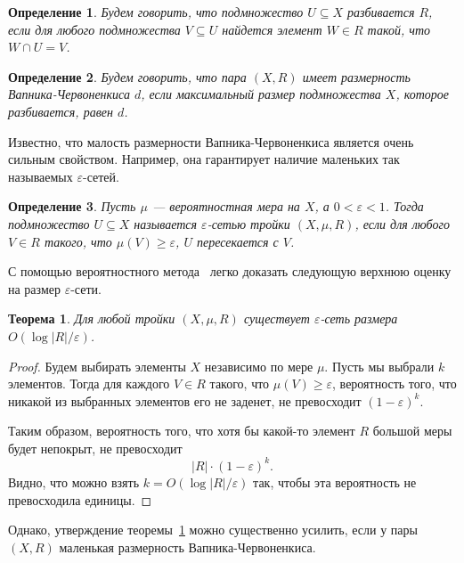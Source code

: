 \documentclass[12pt]{article}
\newtheorem{definition}{Определение}
\newtheorem{theorem}{Теорема}
\begin{document}
    \begin{definition}
        Будем говорить, что подмножество $U \subseteq X$ \emph{разбивается} $R$, если
        для любого подмножества $V \subseteq U$ найдется элемент $W \in R$ такой,
        что $W \cap U = V$.
    \end{definition}
    \begin{definition}
        Будем говорить, что пара $(X, R)$ имеет размерность Вапника-Червоненкиса $d$, если максимальный размер 
        подмножества $X$, которое разбивается, равен $d$.
    \end{definition}

    Известно, что малость размерности Вапника-Червоненкиса является очень сильным свойством. Например, она гарантирует
    наличие маленьких так называемых $\varepsilon$-сетей.

    \begin{definition}
        Пусть $\mu$ --- вероятностная мера на $X$, а $0 < \varepsilon < 1$.
        Тогда подмножество $U \subseteq X$
        называется \emph{$\varepsilon$-сетью} тройки $(X, \mu, R)$, если для любого
        $V \in R$ такого, что $\mu(V) \geq \varepsilon$, $U$ пересекается с $V$.
    \end{definition}

    С помощью вероятностного метода~\cite{AS92} легко доказать следующую верхнюю оценку на размер
    $\varepsilon$-сети.

    \begin{theorem}
        \label{naive_epsilon_net}
        Для любой тройки $(X, \mu, R)$ существует $\varepsilon$-сеть размера
        $O(\log |R| / \varepsilon)$.
    \end{theorem}
    \begin{proof}
        Будем выбирать элементы $X$ независимо по мере $\mu$.
        Пусть мы выбрали $k$ элементов. Тогда для каждого $V \in R$ такого, что
        $\mu(V) \geq \varepsilon$, вероятность того, что никакой из выбранных элементов
        его не заденет, не превосходит $(1 - \varepsilon)^k$.

        Таким образом, вероятность того, что хотя бы какой-то элемент $R$ большой меры будет
        непокрыт, не превосходит
        $$
            |R| \cdot (1 - \varepsilon)^k.
        $$
        Видно, что можно взять $k = O(\log |R| / \varepsilon)$ так, чтобы эта вероятность не превосходила
        единицы.
    \end{proof}

    Однако, утверждение теоремы~\ref{naive_epsilon_net} можно существенно усилить, если у пары $(X, R)$
    маленькая размерность Вапника-Червоненкиса.
\end{document}
